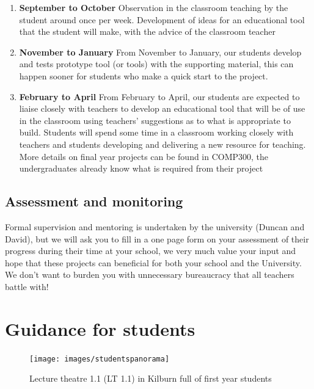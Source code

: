 \documentclass[
  12pt,
]{book}
\providecommand{\tightlist}{%
  \setlength{\itemsep}{0pt}\setlength{\parskip}{0pt}}
\begin{document}
\begin{enumerate}
\def\labelenumi{\arabic{enumi}.}
\tightlist
\item
  \textbf{September to October} Observation in the classroom teaching by the student around once per week. Development of ideas for an educational tool that the student will make, with the advice of the classroom teacher
\item
  \textbf{November to January} From November to January, our students develop and tests prototype tool (or tools) with the supporting material, this can happen sooner for students who make a quick start to the project.
\item
  \textbf{February to April} From February to April, our students are expected to liaise closely with teachers to develop an educational tool that will be of use in the classroom using teachers' suggestions as to what is appropriate to build. Students will spend some time in a classroom working closely with teachers and students developing and delivering a new resource for teaching. More details on final year projects can be found in COMP300, the undergraduates already know what is required from their project
\end{enumerate}

\hypertarget{assessment-and-monitoring}{%
\subsection{Assessment and monitoring}\label{assessment-and-monitoring}}

Formal supervision and mentoring is undertaken by the university (Duncan and David), but we will ask you to fill in a one page form on your assessment of their progress during their time at your school, we very much value your input and hope that these projects can beneficial for both your school and the University. We don't want to burden you with unnecessary bureaucracy that all teachers battle with!

\hypertarget{guidance-for-students}{%
\section{Guidance for students}\label{guidance-for-students}}

\begin{figure}

{\centering \texttt{[image: images/studentspanorama]} 

}

\caption{Lecture theatre 1.1 (LT 1.1) in Kilburn full of first year students}\label{fig:unnamed-chunk-8}
\end{figure}
\end{document}
